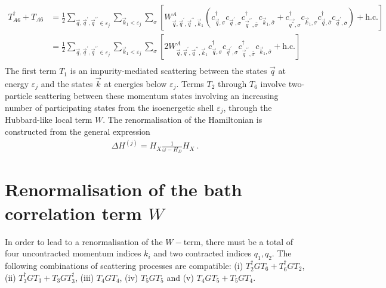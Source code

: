 \documentclass{revtex4-2}
\begin{document}
\begin{equation}
\begin{aligned}
	T_{A6}^\dagger + T_{A6} &= \frac{1}{2}\sum_{\vec q, \vec q^\prime, \vec q^{\prime\prime} \in \varepsilon_j}\sum_{\vec k_1 < \varepsilon_j}\sum_{\sigma} \left[W^A_{\vec q,\vec q^\prime,\vec q^{\prime\prime}, \vec k_1}\left(c^\dagger_{\vec q,\sigma}c_{\vec q^\prime,\sigma}c^\dagger_{\vec q^{\prime\prime},\bar\sigma}c_{\vec k_1,\bar\sigma} + c^\dagger_{\vec{q^{\prime\prime}},\sigma}c_{\vec k_1,\sigma}c^\dagger_{\vec q,\bar\sigma}c_{\vec q^\prime,\bar\sigma}\right) + \text{h.c.}\right]\\
				&= \frac{1}{2}\sum_{\vec q, \vec q^\prime, \vec q^{\prime\prime} \in \varepsilon_j}\sum_{\vec k_1 < \varepsilon_j}\sum_{\sigma} \left[2W^A_{\vec q,\vec q^\prime,\vec q^{\prime\prime}, \vec k_1}c^\dagger_{\vec q,\sigma}c_{\vec q^\prime,\sigma}c^\dagger_{\vec q^{\prime\prime},\bar\sigma}c_{\vec k_1,\bar\sigma} + \text{h.c.}\right]\\
\end{aligned}\end{equation}
The first term \(T_1\) is an impurity-mediated scattering between the states \(\vec q\) at energy \(\varepsilon_j\) and the states \(\vec k\) at energies below \(\varepsilon_j\). Terms \(T_2\) through \(T_6\) involve two-particle scattering between these momentum states involving an increasing number of participating states from the isoenergetic shell \(\varepsilon_j\), through the Hubbard-like local term \(W\). The renormalisation of the Hamiltonian is constructed from the general expression
\begin{equation}\begin{aligned}
	\Delta H^{(j)} = H_X \frac{1}{\omega- H_D} H_X~.
\end{aligned}\end{equation}

\section{Renormalisation of the bath correlation term \(W\)}
In order to lead to a renormalisation of the \(W-\)term, there must be a total of four uncontracted momentum indices \(k_i\) and two contracted indices \(q_1, q_2\). The following combinations of scattering processes are compatible: (i) \(T_2^\dagger G T_6 + T_6^\dagger G T_2\), (ii) \(T_3^\dagger G T_3 + T_3 G T_3^\dagger\), (iii) \(T_4 G T_4\), (iv) \(T_5 G T_5\) and (v) \(T_4 G T_5 + T_5 G T_4\).
\end{document}
